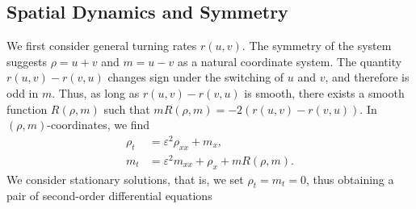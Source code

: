\documentclass[10pt]{article}
\begin{document}
\subsection{Spatial Dynamics and Symmetry}\label{section:symmetry}
We first consider general turning rates $r(u,v)$.  The symmetry of the system suggests $\rho = u+v$ and $m = u-v$ as a natural coordinate system. The quantity $r(u,v) - r(v,u)$ changes sign under the switching of $u$ and $v$, and therefore is odd in $m$.  Thus, as long as $r(u,v)-r(v,u)$ is smooth, there exists a smooth function $R(\rho,m)$ such that $mR(\rho,m) = -2(r(u,v) - r(v,u))$.  In $(\rho,m)$-coordinates, we find
\begin{equation}
\begin{aligned}
\rho_t &= \varepsilon^2 \rho_{xx} + m_x,\\
m_t &= \varepsilon^2 m_{xx} + \rho_x +mR(\rho,m).
\end{aligned}
\label{rho_m}
\end{equation}
We consider stationary solutions, that is, we set $\rho_t = m_t = 0$, thus obtaining a pair of second-order differential equations
\end{document}
